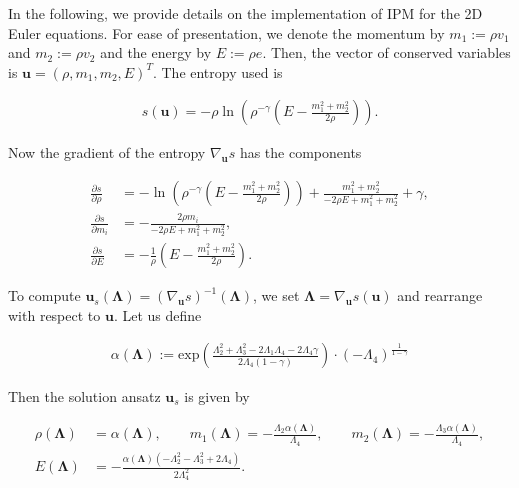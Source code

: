 In the following, we provide details on the implementation of IPM for the 2D Euler equations. For ease of presentation, we denote the momentum by $m_1 := \rho v_1$ and $m_2:=\rho v_2$ and the energy by $E:=\rho e$. Then, the vector of conserved variables is $\bm u = (\rho,m_1,m_2,E)^T$. The entropy used is
\begin{linenomath*}\begin{align*}
s(\bm u) = -\rho \ln \left(\rho^{-\gamma} \left(E - \frac{m_1^2 + m_2^2}{2
\rho}\right)\right).
\end{align*}\end{linenomath*}
Now the gradient of the entropy $\nabla_{\bm u} s$ has the components
\begin{linenomath*}\begin{align*}
\frac{\partial s}{\partial \rho} &= -\ln \left(\rho^{-\gamma}\left(E-\frac{m_1^2+m_2^2}{2 \rho }\right)\right)+\frac{m_1^2+m_2^2}{-2 \rho  E+m_1^2+m_2^2}+\gamma, \\
\frac{\partial s}{\partial m_i} &= -\frac{2\rho  m_i}{-2 \rho  E+m_1^2+m_2^2}, \\
\frac{\partial s}{\partial E} &=-\frac1\rho\left(E-\frac{m_1^2+m_2^2}{2 \rho }\right).
\end{align*}\end{linenomath*}
To compute $\bm u_s(\bm\Lambda) = (\nabla_{\bm u}s)^{-1}(\bm \Lambda)$, we set $\bm \Lambda = \nabla_{\bm u}s(\bm u)$ and rearrange with respect to $\bm u$. Let us define
\begin{linenomath*}\begin{align*}
\alpha(\bm\Lambda) := \text{exp}\left(\frac{ \Lambda_2^2 + \Lambda_3^2 - 2\Lambda_1  \Lambda_4 - 2 \Lambda_4  \gamma }{ 2 \Lambda_4(1-\gamma) } \right) \cdot (-\Lambda_4)^{\frac{1}{1-\gamma}}
\end{align*}\end{linenomath*}
Then the solution ansatz $\bm u_s$ is given by
\begin{linenomath*}\begin{align*}
\rho(\bm\Lambda) &= \alpha(\bm\Lambda),\qquad m_1(\bm\Lambda) = -\frac{\Lambda_2 \alpha(\bm{\Lambda})}{\Lambda_4},\qquad m_2(\bm\Lambda) = -\frac{\Lambda_3 \alpha(\bm{\Lambda})}{\Lambda_4}, \\
E(\bm\Lambda) &= -\frac{  \alpha(\bm{\Lambda}) ( -\Lambda_2^2 - \Lambda_3^2 + 2\Lambda_4 ) }{ 2 \Lambda_4^2}.
\end{align*}\end{linenomath*}